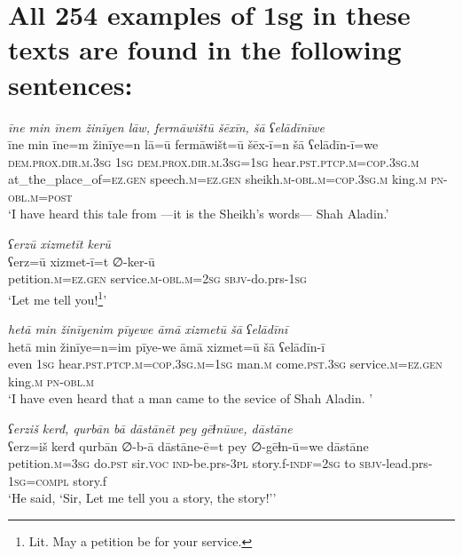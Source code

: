 \chapter{All 254 examples of 1sg in these texts are found in the following sentences:}

\ea \label{ZB.37}
\textit{īne min īnem žinīyen lāw, fermāwištū šēxīn, šā ʕelādīnīwe} \\ 
\gll īne min īne=m žinīye=n lā=ū fermāwišt=ū šēx-ī=n šā ʕelādīn-ī=we \\ 
 \textsc{dem.prox}\textsc{.dir}\textsc{.m}\textsc{.3sg} \textsc{1sg} \textsc{dem.prox}\textsc{.dir}\textsc{.m}\textsc{.3sg}\textsc{=\textsc{1sg}} hear\textsc{.pst}\textsc{.ptcp}\textsc{.m}\textsc{=cop}\textsc{.3sg}\textsc{.m} at\_the\_place\_of\textsc{\textsc{=ez.gen}} speech\textsc{.m}\textsc{\textsc{=ez.gen}} sheikh\textsc{.m}\textsc{-obl}\textsc{.m}\textsc{=cop}\textsc{.3sg}\textsc{.m} king\textsc{.m} \textsc{pn}\textsc{-obl}\textsc{.m}\textsc{=\textsc{post}} \\ 
\glt `I have heard this tale from —it is the Sheikh’s words— Shah Aladin.'
\z 
 
\ea \label{ZQ.1}
\textit{ʕerzū xizmetīt kerū} \\ 
\gll ʕerz=ū xizmet-ī=t ∅-ker-ū \\ 
 petition\textsc{.m}\textsc{=ez.gen} service\textsc{.m}\textsc{-obl}\textsc{.m}\textsc{=\textsc{2sg}} \textsc{sbjv-}do.prs\textsc{-\textsc{1sg}} \\ 
\glt `Let me tell you!\footnote{Lit. May a petition be for your service.}'
\z 
 
\ea \label{ZQ.2}
\textit{hetā min žinīyenim pīyewe āmā xizmetū šā ʕelādīnī} \\ 
\gll hetā min žinīye=n=im pīye-we āmā xizmet=ū šā ʕelādīn-ī \\ 
 even \textsc{1sg} hear\textsc{.pst}\textsc{.ptcp}\textsc{.m}\textsc{=cop}\textsc{.3sg}\textsc{.m}\textsc{=\textsc{1sg}} man\textsc{.m} come\textsc{.pst}\textsc{.3sg} service\textsc{.m}\textsc{=ez.gen} king\textsc{.m} \textsc{pn}\textsc{-obl}\textsc{.m} \\ 
\glt `I have even heard that a man came to the sevice of Shah Aladin. '
\z 
 
\ea \label{ZQ.7}
\textit{ʕerziš kerđ, qurbān bā dāstānēt pey gēɫnūwe, dāstāne} \\ 
\gll ʕerz=iš kerđ qurbān ∅-b-ā dāstāne-ē=t pey ∅-gēɫn-ū=we dāstāne \\ 
 petition\textsc{.m}\textsc{=3sg} do\textsc{.pst} sir.\textsc{voc} \textsc{ind-}be.prs\textsc{-3pl} story.f\textsc{-indf}\textsc{=\textsc{2sg}} to \textsc{sbjv-}lead.prs\textsc{-\textsc{1sg}}\textsc{=compl} story.f \\ 
\glt `He said, ‘Sir, Let me tell you a story, the story!’'
\z 
 
